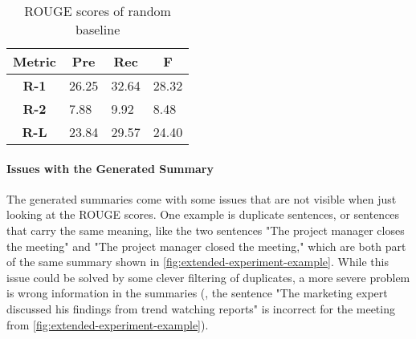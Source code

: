 \begin{table}[h]
\centering
\begin{tabular}{@{}clll@{}}
\toprule
\textbf{Metric} & \multicolumn{1}{c}{\textbf{Pre}} & \multicolumn{1}{c}{\textbf{Rec}} & \multicolumn{1}{c}{\textbf{F}} \\ \midrule
\textbf{R-1}    & 26.25                           & 32.64                           & 28.32                         \\
\textbf{R-2}    & 7.88                            & 9.92                            & 8.48                          \\
\textbf{R-L}    & 23.84                           & 29.57                           & 24.40                         \\ \bottomrule
\end{tabular}
\caption{ROUGE scores of random baseline}
\label{tab:extended-experiment-rouge-random}
\end{table}

\paragraph{Issues with the Generated Summary}

The generated summaries come with some issues that are not visible when just looking at the ROUGE scores.
One example is duplicate sentences, or sentences that carry the same meaning, like the two sentences "The project manager closes the meeting" and "The project manager closed the meeting," which are both part of the same summary shown in \cref{fig:extended-experiment-example}.
While this issue could be solved by some clever filtering of duplicates, a more severe problem is wrong information in the summaries (\eg, the sentence "The marketing expert discussed his findings from trend watching reports" is incorrect for the meeting from \cref{fig:extended-experiment-example}).